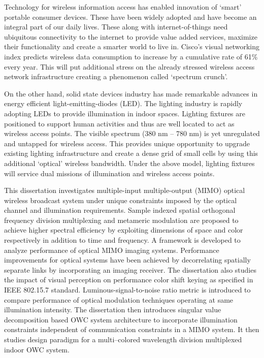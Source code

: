 Technology for wireless information access has enabled innovation of `smart' portable consumer devices. These have been widely adopted and have become an integral part of our daily lives. These along with internet-of-things need ubiquitous connectivity to the internet to provide value added services, maximize their functionality and create a smarter world to live in. Cisco's visual networking index predicts wireless data consumption to increase by a cumulative rate of 61\% every year. This will put additional stress on the already stressed wireless access network infrastructure creating a phenomenon called `spectrum crunch'. 

On the other hand, solid state devices industry has made remarkable advances in energy efficient light-emitting-diodes (LED). The lighting industry is rapidly adopting LEDs to provide illumination in indoor spaces. Lighting fixtures are positioned to support human activities and thus are well located to act as wireless access points. The visible spectrum (380 nm -- 780 nm) is yet unregulated and untapped for wireless access. This provides unique opportunity to upgrade existing lighting infrastructure and create a dense grid of small cells by using this additional `optical' wireless bandwidth. Under the above model, lighting fixtures will service dual missions of illumination and wireless access points. 

This dissertation investigates multiple-input multiple-output (MIMO) optical wireless broadcast system under unique constraints imposed by the optical channel and illumination requirements. Sample indexed spatial orthogonal frequency division multiplexing and metameric modulation are proposed to achieve higher spectral efficiency by exploiting dimensions of space and color respectively in addition to time and frequency. A framework is developed to analyze performance of optical MIMO imaging systems. Performance improvements for optical systems have been achieved by decorrelating spatially separate links by incorporating an imaging receiver. The dissertation also studies the impact of visual perception on performance color shift keying as specified in IEEE 802.15.7 standard. Luminous-signal-to-noise ratio metric is introduced to compare performance of optical modulation techniques operating at same illumination intensity. The dissertation then introduces singular value decomposition based OWC system architecture to incorporate illumination constraints independent of communication constraints in a MIMO system. It then studies design paradigm for a multi--colored wavelength division multiplexed indoor OWC system. 